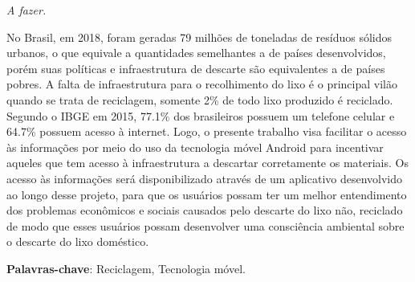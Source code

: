 \documentclass[
	12pt,				%
	openany,			%
	twoside,			%
	a4paper,			%
	english,			%
	french,				%
	spanish,			%
	brazil				%
	]{abntex2}
\begin{document}
\begin{dedicatoria}
   \vspace*{\fill}
   \centering
   \noindent
   \textit{ A fazer.} \vspace*{\fill}
\end{dedicatoria}

\begin{agradecimentos}


\end{agradecimentos}





\setlength{\absparsep}{18pt} %
\begin{resumo}
No Brasil, em 2018, foram geradas 79 milhões de toneladas de resíduos sólidos urbanos, o que equivale a quantidades semelhantes a de países desenvolvidos, porém suas políticas e infraestrutura de descarte são equivalentes a de países pobres. A falta de infraestrutura para o recolhimento do lixo é o principal vilão quando se trata de reciclagem, somente 2\% de todo lixo produzido é reciclado.
	Segundo o IBGE em 2015, 77.1\% dos brasileiros possuem um telefone celular e 64.7\% possuem acesso à internet. Logo, o presente trabalho visa facilitar o acesso às informações por meio do uso da tecnologia móvel Android para incentivar aqueles que tem acesso à infraestrutura a descartar corretamente os materiais. Os acesso às informações será disponibilizado através de um aplicativo desenvolvido ao longo desse projeto, para que os usuários possam ter um melhor entendimento dos problemas econômicos e sociais causados pelo descarte do lixo não, reciclado de modo que esses usuários possam desenvolver uma consciência ambiental sobre o descarte do lixo doméstico.


 \textbf{Palavras-chave}: Reciclagem, Tecnologia móvel.
\end{resumo}
\end{document}
